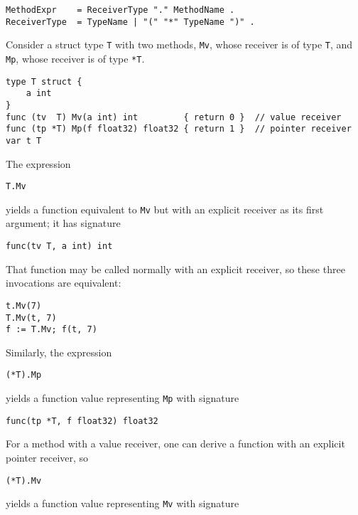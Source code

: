 {\begin{Verbatim}[frame=single]
MethodExpr    = ReceiverType "." MethodName .
ReceiverType  = TypeName | "(" "*" TypeName ")" .
\end{Verbatim}

Consider a struct type \texttt{T} with two methods, \texttt{Mv}, whose
receiver is of type \texttt{T}, and \texttt{Mp}, whose receiver is of
type \texttt{*T}.

\begin{Verbatim}[frame=single]
type T struct {
    a int
}
func (tv  T) Mv(a int) int         { return 0 }  // value receiver
func (tp *T) Mp(f float32) float32 { return 1 }  // pointer receiver
var t T
\end{Verbatim}

The expression

\begin{Verbatim}[frame=single]
T.Mv
\end{Verbatim}

yields a function equivalent to \texttt{Mv} but with an explicit
receiver as its first argument; it has signature

\begin{Verbatim}[frame=single]
func(tv T, a int) int
\end{Verbatim}

That function may be called normally with an explicit receiver, so these
three invocations are equivalent:

\begin{Verbatim}[frame=single]
t.Mv(7)
T.Mv(t, 7)
f := T.Mv; f(t, 7)
\end{Verbatim}

Similarly, the expression

\begin{Verbatim}[frame=single]
(*T).Mp
\end{Verbatim}

yields a function value representing \texttt{Mp} with signature

\begin{Verbatim}[frame=single]
func(tp *T, f float32) float32
\end{Verbatim}

For a method with a value receiver, one can derive a function with an
explicit pointer receiver, so

\begin{Verbatim}[frame=single]
(*T).Mv
\end{Verbatim}

yields a function value representing \texttt{Mv} with signature

}
